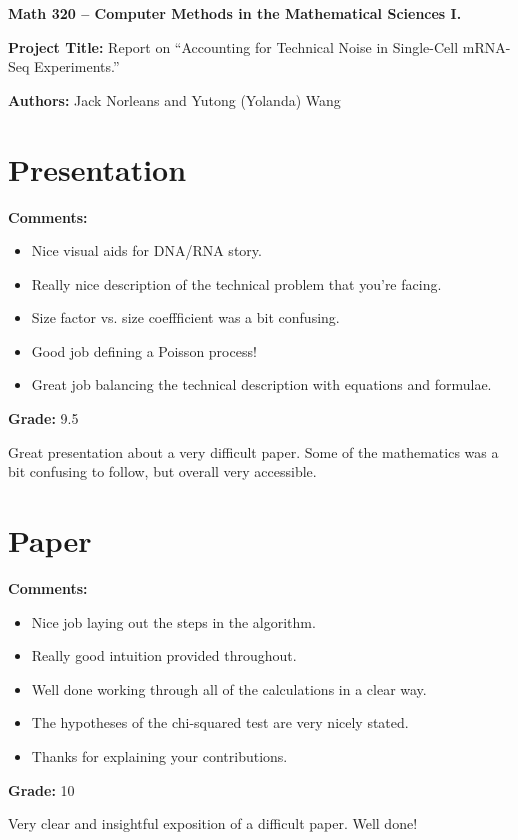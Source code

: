 \documentclass[12pt]{article}
\begin{document}
{\bf \large Math 320 -- Computer Methods in the Mathematical Sciences I.}\\

\vspace{3mm}

{\bf \large Project Title:} Report on ``Accounting for Technical Noise
in Single-Cell mRNA-Seq Experiments.''\\
\vspace{2mm}

{\bf \large Authors:} Jack Norleans and Yutong (Yolanda) Wang\\

\vspace{3mm}

\section{Presentation}
{\bf \large Comments:}
\begin{itemize}
\item Nice visual aids for DNA/RNA story.
\item Really nice description of the technical problem that you're facing.
\item Size factor vs. size coeffficient was a bit confusing.
\item Good job defining a Poisson process!
\item Great job balancing the technical description with equations and formulae.
\end{itemize}

{\bf \large Grade:} 9.5

Great presentation about a very difficult paper.
Some of the mathematics was a bit confusing to follow, but overall
very accessible.

\section{Paper}

{\bf \large Comments:}
\begin{itemize}
\item Nice job laying out the steps in the algorithm.
\item Really good intuition provided throughout.
\item Well done working through all of the calculations in a clear way.
\item The hypotheses of the chi-squared test are very nicely stated.
\item Thanks for explaining your contributions.
\end{itemize}

{\bf \large Grade:} 10

Very clear and insightful exposition of a difficult paper.
Well done!
\end{document}
